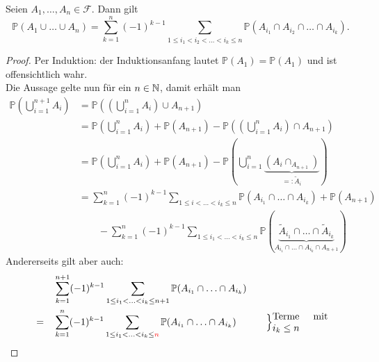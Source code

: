 \begin{corollary}\label{cor:einschluss-ausschluss-prinzip}
    Seien $A_1,\ldots,A_n \in \mathcal{F}$. Dann gilt
    \[
        \mathbb{P}(A_1 \cup \ldots \cup A_n) = \sum_{k=1}^{n} (-1)^{k-1} \sum_{1\leq i_1<i_2<\ldots<i_k \leq n} \mathbb{P}(A_{i_1} \cap A_{i_2} \cap \ldots \cap A_{i_k})
    .\] 
\end{corollary}
\begin{proof}
    Per Induktion: der Induktionsanfang lautet  $\mathbb{P}(A_1) = \mathbb{P}(A_1)$ und ist offensichtlich wahr. \\
    Die Aussage gelte nun für ein $n\in \mathbb{N}$, damit erhält man
    \begin{equation}
        \begin{split}
            \mathbb{P}\left( \bigcup_{i=1}^{n+1} A_i \right)  &= \mathbb{P}\left( \left(\bigcup_{i=1}^{n}A_i \right) \cup A_{n+1}\right)  \\
                                                              &= \mathbb{P}\left(\bigcup_{i=1}^{n} A_i\right) + \mathbb{P}(A_{n+1}) - \mathbb{P}\left( \left( \bigcup_{i=1}^n A_i \right) \cap A_{n+1} \right)  \\
                                                              &= \mathbb{P}\left( \bigcup_{i=1}^{n} A_i \right)  + \mathbb{P}(A_{n+1}) - \mathbb{P}\left( \bigcup_{i=1}^n \underbrace{(A_i \cap _{A_{n+1}})}_{=: \tilde{A}_i} \right)  \\
                                                              &= \sum_{k=1}^{n} (-1)^{k-1} \sum_{1\leq i<\ldots<i_k \leq n} \mathbb{P}(A_{i_1} \cap \ldots \cap A_{i_k}) + \mathbb{P}(A_{n+1}) \\
                                                              &\qquad -\sum_{k=1}^n (-1)^{k-1} \sum_{1\leq i_1 < \ldots < i_k \leq n} \mathbb{P}(\underbrace{\tilde{A}_{i_1} \cap \ldots \cap \tilde{A}_{i_k}}_{A_{i_1} \cap \ldots \cap A_{i_k} \cap A_{n+1}})
        \end{split}
    \end{equation}
    Andererseits gilt aber auch:
    \begin{alignat*}{5}
           &\quad&  &\sum_{k=1} ^{n+1} (-1)^{k-1} \sum_{1\leq i_1<\ldots<i_k \leq  n+1} \mathbb{P}(A_{i_1} \cap \ldots \cap A_{i_k}) &\quad & \\
           &= & &\sum\limits_{k=1}^{n}(-1)^{k-1} \sum\limits_{1\leq i_1< \ldots < i_k \leq  \color{red} n} \mathbb{P}(A_{i_1} \cap \ldots \cap A_{i_k}) & \quad &\Big\}\text{\parbox{2cm}{Terme mit $i_k\leq n$}} \\

\end{alignat*}
\end{proof}
